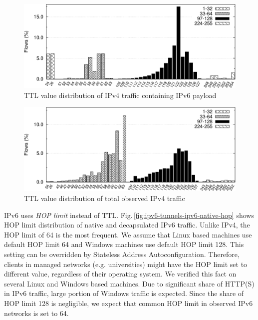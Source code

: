 \begin{figure}[!tb]
    \includegraphics[width=1.00\linewidth]{figures/paper-tunnels/ttl/ttl}
    \caption{TTL value distribution of IPv4 traffic containing IPv6 payload}
    \label{fig:ipv6-tunnels-ipv4-ttl}
\end{figure}

\begin{figure}[!tb]
    \includegraphics[width=1.0\linewidth]{figures/paper-tunnels/ttl/ttl4}
    \caption{TTL value distribution of total observed IPv4 traffic}
    \label{fig:ipv6-tunnels-ipv4-ttl4}
\end{figure}

IPv6 uses \textit{HOP limit} instead of TTL. Fig.\,\ref{fig:ipv6-tunnels-ipv6-native-hop} shows HOP limit distribution of native and decapsulated IPv6 traffic. Unlike IPv4, the HOP limit of 64 is the most frequent. We assume that Linux based machines use default HOP limit 64 and Windows machines use default HOP limit 128. This setting can be overridden by Stateless Address Autoconfiguration. Therefore, clients in managed networks (e.g. universities) might have the HOP limit set to different value, regardless of their operating system. We verified this fact on several Linux and Windows based machines. Due to significant share of HTTP(S) in IPv6 traffic, large portion of Windows traffic is expected. Since the share of HOP limit 128 is negligible, we expect that common HOP limit in observed IPv6 networks is set to 64.

